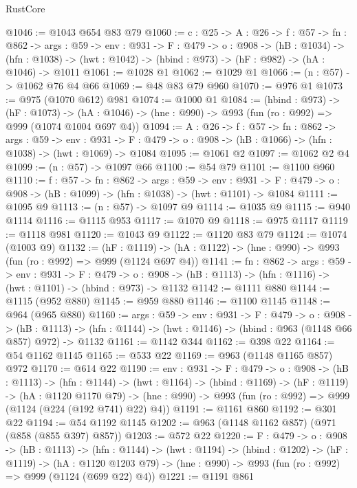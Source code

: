 \begin{lexlean}{RustCore}
\begin{coremodule}
@1046 := @1043 @654 @83 @79
@1060 := {c : @25} ->
  {A : @26} ->
  {f : @57} ->
  {fn : @862} ->
  {args : @59} ->
  {env : @931} ->
  {F : @479} ->
  {o : @908} ->
  (hB : @1034) ->
  (hfn : @1038) -> (hwt : @1042) -> (hbind : @973) -> (hF : @982) -> (hA : @1046) -> @1011
@1061 := @1028 @1
@1062 := @1029 @1
@1066 := (n : @57) -> @1062 @76 @4 @66
@1069 := @48 @83 @79 @960
@1070 := @976 @1
@1073 := @975 (@1070 @612) @981
@1074 := @1000 @1
@1084 := (hbind : @973) ->
  (hF : @1073) ->
  (hA : @1046) -> (hne : @990) -> @993 (fun (ro : @992) => @999 (@1074 @1004 @697 @4))
@1094 := {A : @26} ->
  {f : @57} ->
  {fn : @862} ->
  {args : @59} ->
  {env : @931} ->
  {F : @479} -> {o : @908} -> (hB : @1066) -> (hfn : @1038) -> (hwt : @1069) -> @1084
@1095 := @1061 @2
@1097 := @1062 @2 @4
@1099 := (n : @57) -> @1097 @66
@1100 := @54 @79
@1101 := @1100 @960
@1110 := {f : @57} ->
  {fn : @862} ->
  {args : @59} ->
  {env : @931} ->
  {F : @479} -> {o : @908} -> (hB : @1099) -> (hfn : @1038) -> (hwt : @1101) -> @1084
@1111 := @1095 @9
@1113 := (n : @57) -> @1097 @9
@1114 := @1035 @9
@1115 := @940 @1114
@1116 := @1115 @953
@1117 := @1070 @9
@1118 := @975 @1117
@1119 := @1118 @981
@1120 := @1043 @9
@1122 := @1120 @83 @79
@1124 := @1074 (@1003 @9)
@1132 := (hF : @1119) ->
  (hA : @1122) -> (hne : @990) -> @993 (fun (ro : @992) => @999 (@1124 @697 @4))
@1141 := {fn : @862} ->
  {args : @59} ->
  {env : @931} ->
  {F : @479} ->
  {o : @908} -> (hB : @1113) -> (hfn : @1116) -> (hwt : @1101) -> (hbind : @973) -> @1132
@1142 := @1111 @880
@1144 := @1115 (@952 @880)
@1145 := @959 @880
@1146 := @1100 @1145
@1148 := @964 (@965 @880)
@1160 := {args : @59} ->
  {env : @931} ->
  {F : @479} ->
  {o : @908} ->
  (hB : @1113) -> (hfn : @1144) -> (hwt : @1146) -> (hbind : @963 (@1148 @66 @857) @972) -> @1132
@1161 := @1142 @344
@1162 := @398 @22
@1164 := @54 @1162 @1145
@1165 := @533 @22
@1169 := @963 (@1148 @1165 @857) @972
@1170 := @614 @22
@1190 := {env : @931} ->
  {F : @479} ->
  {o : @908} ->
  (hB : @1113) ->
  (hfn : @1144) ->
  (hwt : @1164) ->
  (hbind : @1169) ->
  (hF : @1119) ->
  (hA : @1120 @1170 @79) ->
  (hne : @990) -> @993 (fun (ro : @992) => @999 (@1124 (@224 (@192 @741) @22) @4))
@1191 := @1161 @860
@1192 := @301 @22
@1194 := @54 @1192 @1145
@1202 := @963 (@1148 @1162 @857) (@971 (@858 (@855 @397) @857))
@1203 := @572 @22
@1220 := {F : @479} ->
  {o : @908} ->
  (hB : @1113) ->
  (hfn : @1144) ->
  (hwt : @1194) ->
  (hbind : @1202) ->
  (hF : @1119) ->
  (hA : @1120 @1203 @79) -> (hne : @990) -> @993 (fun (ro : @992) => @999 (@1124 (@699 @22) @4))
@1221 := @1191 @861

\end{coremodule}
\end{lexlean}

